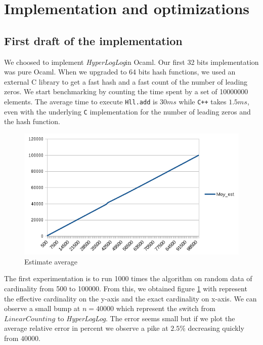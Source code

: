 \documentclass[12pt]{article}
\newcommand{\hll}{\emph{HyperLogLog}}
\begin{document}
\section{Implementation and optimizations}

\subsection{First draft of the implementation}

We choosed to implement \hll in Ocaml. Our first 32 bits
implementation was pure Ocaml. When we upgraded to 64 bits hash
functions, we used an external C library to get a fast hash and a fast
count of the number of leading zeros. We start benchmarking by
counting the time spent by a set of 10000000 elements. The average
time to execute \texttt{Hll.add} is $30ms$ while \texttt{C++} takes
$1.5ms$, even with the underlying \texttt{C} implementation for the
number of leading zeros and the hash function.


\begin{figure}[h!]
   \includegraphics[scale=1]{./moy.png}
   \caption{\label{figmoy}Estimate average}
  
\end{figure}

The first experimentation is to run 1000 times the algorithm on random
data of cardinality from 500 to 100000. From this, we obtained figure
\ref{figmoy} with represent the effective cardinality on the y-axis and
the exact cardinality on x-axis.
We can observe a small bump at $n=40000$ which represent the switch
from $LinearCounting$ to \hll.
The error seems small but if we plot the average relative error in
percent we observe a pike at $2.5\%$ decreasing quickly from $40000$.
\end{document}
